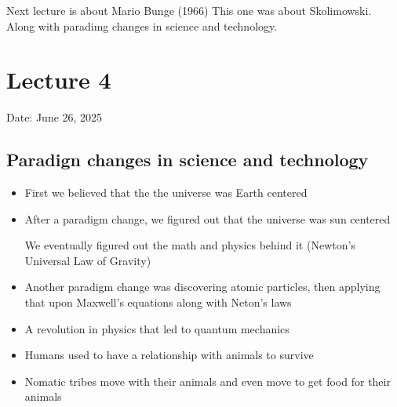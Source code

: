 \documentclass{article}
\begin{document}
Next lecture is about Mario Bunge (1966)
This one was about Skolimowski. Along with paradimg changes in
science and technology.

\newpage

\section{Lecture 4}
Date: June 26, 2025

\subsection{Paradign changes in science and technology}
\begin{itemize}
  \item First we believed that the the universe was
    Earth centered
  \item After a paradigm change, we figured out that the
    universe was sun centered

    We eventually figured out the math and physics behind it (Newton's Universal Law of Gravity)
  \item Another paradigm change was discovering atomic particles,
    then applying that upon Maxwell's equations along with Neton's laws
  \item A revolution in physics that led to quantum mechanics
\end{itemize}

\begin{itemize}
  \item Humans used to have a relationship with animals
    to survive
  \item Nomatic tribes move with their animals and even
    move to get food for their animals
\end{itemize}
\end{document}
